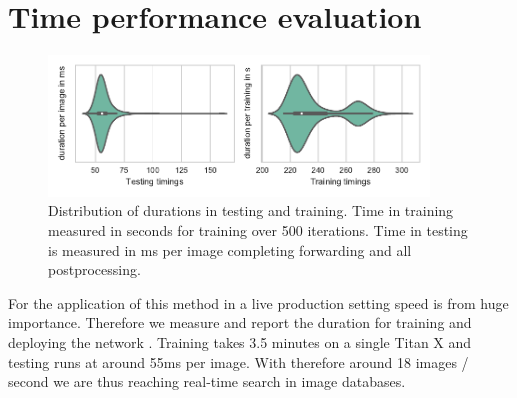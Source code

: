 \section{Time performance evaluation}
\label{sec:results:time}
\begin{figure}[h!]
  \centering
  \includegraphics[width=0.9\textwidth]{figures/timings_fig}
  \caption{Distribution of durations in testing and training. Time in training measured in seconds for training over 500 iterations. Time in testing is measured in ms per image completing forwarding and all postprocessing.}
  \label{fig:timings}
\end{figure}
For the application of this method in a live production setting speed is from huge importance. Therefore we measure and report the duration for training and deploying the network . Training takes 3.5 minutes on a single Titan X and testing runs at around 55ms per image. With therefore around 18 images / second we are thus reaching real-time search in image databases.
